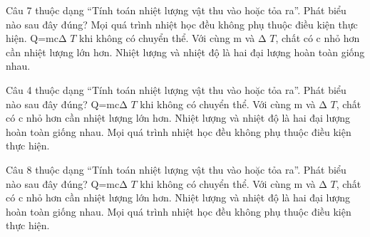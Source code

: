 \begin{ex}
Câu 7 thuộc dạng “Tính toán nhiệt lượng vật thu vào hoặc tỏa ra”. Phát biểu nào sau đây đúng?
\choice
{Mọi quá trình nhiệt học đều không phụ thuộc điều kiện thực hiện.}
{\True Q=mcΔ $T$ khi không có chuyển thể.}
{Với cùng m và Δ $T$, chất có c nhỏ hơn cần nhiệt lượng lớn hơn.}
{Nhiệt lượng và nhiệt độ là hai đại lượng hoàn toàn giống nhau.}
\end{ex}

\begin{ex}
Câu 4 thuộc dạng “Tính toán nhiệt lượng vật thu vào hoặc tỏa ra”. Phát biểu nào sau đây đúng?
\choice
{\True Q=mcΔ $T$ khi không có chuyển thể.}
{Với cùng m và Δ $T$, chất có c nhỏ hơn cần nhiệt lượng lớn hơn.}
{Nhiệt lượng và nhiệt độ là hai đại lượng hoàn toàn giống nhau.}
{Mọi quá trình nhiệt học đều không phụ thuộc điều kiện thực hiện.}
\end{ex}

\begin{ex}
Câu 8 thuộc dạng “Tính toán nhiệt lượng vật thu vào hoặc tỏa ra”. Phát biểu nào sau đây đúng?
\choice
{\True Q=mcΔ $T$ khi không có chuyển thể.}
{Với cùng m và Δ $T$, chất có c nhỏ hơn cần nhiệt lượng lớn hơn.}
{Nhiệt lượng và nhiệt độ là hai đại lượng hoàn toàn giống nhau.}
{Mọi quá trình nhiệt học đều không phụ thuộc điều kiện thực hiện.}
\end{ex}
